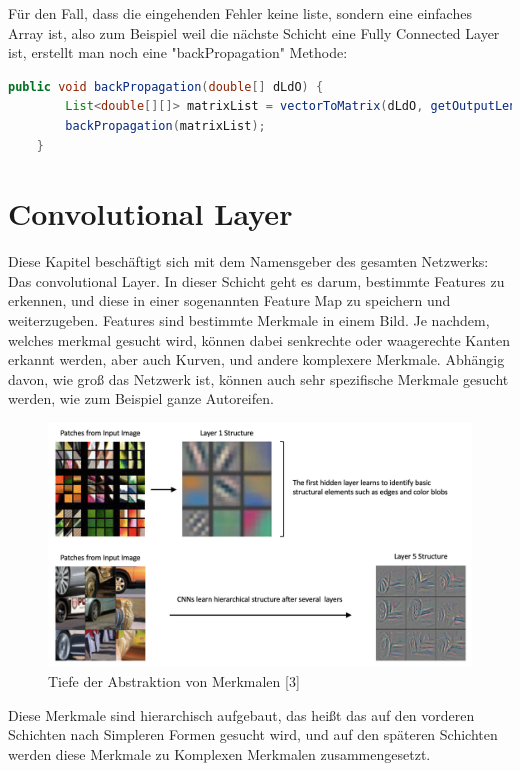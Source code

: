 \documentclass[12pt]{article}
\begin{document}
Für den Fall, dass die eingehenden Fehler keine liste, sondern eine einfaches Array ist, also zum Beispiel weil die nächste Schicht eine Fully Connected Layer ist, erstellt man noch eine "backPropagation" Methode:

\begin{lstlisting}[language=Java]
    public void backPropagation(double[] dLdO) {
        List<double[][]> matrixList = vectorToMatrix(dLdO, getOutputLength(), getOutputRows(), getOutputCols());
        backPropagation(matrixList);
    }
\end{lstlisting}

\section{Convolutional Layer}
Diese Kapitel beschäftigt sich mit dem Namensgeber des gesamten Netzwerks: Das convolutional Layer. 
In dieser Schicht geht es darum, bestimmte Features zu erkennen, und diese in einer sogenannten Feature Map zu speichern und weiterzugeben. Features sind bestimmte Merkmale in einem Bild. Je nachdem, welches merkmal gesucht wird, können dabei senkrechte oder waagerechte Kanten erkannt werden, aber auch Kurven, und andere komplexere Merkmale. Abhängig davon, wie groß das Netzwerk ist, können auch sehr spezifische Merkmale gesucht werden, wie zum Beispiel ganze Autoreifen. 

\begin{figure}[H]
\centering
\includegraphics[scale=0.27]{./Images/tensorflow-keras-cnn-hierarchical-structure.png}
\caption{Tiefe der Abstraktion von Merkmalen [3]}
\label{Tiefe der Abstraktion von Merkmalen [3]}
\end{figure}

Diese Merkmale sind hierarchisch aufgebaut, das heißt das auf den vorderen Schichten nach Simpleren Formen gesucht wird, und auf den späteren Schichten werden diese Merkmale zu Komplexen Merkmalen zusammengesetzt.
\end{document}
